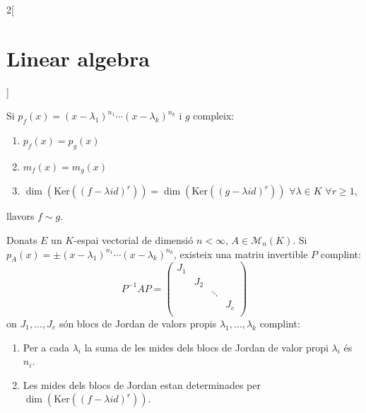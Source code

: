 \documentclass[class=article,10pt,crop=false]{standalone}
\begin{document}
\begin{multicols}{2}[\section{Linear algebra}]
\begin{theorem}
\end{theorem}
\begin{theorem}
Si $p_f(x)=(x-\lambda_1)^{n_1}\cdots(x-\lambda_k)^{n_k}$ i $g$ compleix:
\begin{enumerate}
    \item $p_f(x)=p_g(x)$
    \item $m_f(x)=m_g(x)$
    \item $\dim(\text{Ker}((f-\lambda id)^r))=\dim(\text{Ker}((g-\lambda id)^r))$ $\forall\lambda\in K$ $\forall r\geq 1$,
\end{enumerate}
llavors $f\sim g$.
\end{theorem}
\begin{prop}
Donats $E$ un $K$-espai vectorial de dimensió $n<\infty$, $A\in\mathcal{M}_n(K)$. Si $p_A(x)=\pm(x-\lambda_1)^{n_1}\cdots(x-\lambda_k)^{n_k}$, existeix una matriu invertible $P$ complint: $$P^{-1}AP=\begin{pmatrix}
J_1 & & & \\
& J_2 & & \\
& & \ddots & \\
& & & J_e \\
\end{pmatrix}$$
on $J_1,\ldots,J_e$ són blocs de Jordan de valors propis $\lambda_1,\ldots,\lambda_k$ complint:
\begin{enumerate}
    \item Per a cada $\lambda_i$ la suma de les mides dels blocs de Jordan de valor propi $\lambda_i$ és $n_i$.
    \item Les mides dels blocs de Jordan estan determinades per $\dim(\text{Ker}((f-\lambda id)^r))$.
\end{enumerate}
\end{prop}

\end{multicols}
\end{document}
